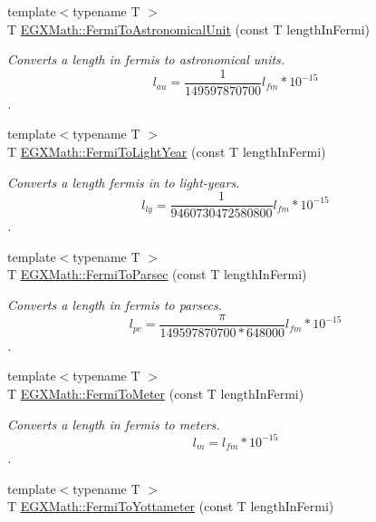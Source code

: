 \begin{DoxyCompactItemize}
\item 
{\footnotesize template$<$typename T $>$ }\\T \mbox{\hyperlink{group___e_g_x_math-_conversions-_length_conversions-_non-_s_i-_fermi-_astronomical_ga15004dd6eba6bf24f731945b4d78efcd}{E\+G\+X\+Math\+::\+Fermi\+To\+Astronomical\+Unit}} (const T length\+In\+Fermi)
\begin{DoxyCompactList}\small\item\em Converts a length in fermis to astronomical units. \[ l_{au}= \frac{1}{149597870700} l_{fm} * 10^{-15} \]. \end{DoxyCompactList}\item 
{\footnotesize template$<$typename T $>$ }\\T \mbox{\hyperlink{group___e_g_x_math-_conversions-_length_conversions-_non-_s_i-_fermi-_astronomical_ga970405631cdcf18ba0c2bd9b3ec37dec}{E\+G\+X\+Math\+::\+Fermi\+To\+Light\+Year}} (const T length\+In\+Fermi)
\begin{DoxyCompactList}\small\item\em Converts a length fermis in to light-\/years. \[ l_{ly}= \frac{1}{9460730472580800} l_{fm} * 10^{-15} \]. \end{DoxyCompactList}\item 
{\footnotesize template$<$typename T $>$ }\\T \mbox{\hyperlink{group___e_g_x_math-_conversions-_length_conversions-_non-_s_i-_fermi-_astronomical_gab8899d90957bc1951d2173162dca0672}{E\+G\+X\+Math\+::\+Fermi\+To\+Parsec}} (const T length\+In\+Fermi)
\begin{DoxyCompactList}\small\item\em Converts a length in fermis to parsecs. \[ l_{pc}=\frac{\pi}{149597870700 * 648000} l_{fm} * 10^{-15} \]. \end{DoxyCompactList}\item 
{\footnotesize template$<$typename T $>$ }\\T \mbox{\hyperlink{group___e_g_x_math-_conversions-_length_conversions-_non-_s_i-_fermi-_s_i_ga4b46bec209c12abbb998b2301d273d28}{E\+G\+X\+Math\+::\+Fermi\+To\+Meter}} (const T length\+In\+Fermi)
\begin{DoxyCompactList}\small\item\em Converts a length in fermis to meters. \[ l_{m}=l_{fm} * 10^{-15} \]. \end{DoxyCompactList}\item 
{\footnotesize template$<$typename T $>$ }\\T \mbox{\hyperlink{group___e_g_x_math-_conversions-_length_conversions-_non-_s_i-_fermi-_s_i_ga1d4accde11444a024a737b2c007dfe26}{E\+G\+X\+Math\+::\+Fermi\+To\+Yottameter}} (const T length\+In\+Fermi)

\end{DoxyCompactItemize}

